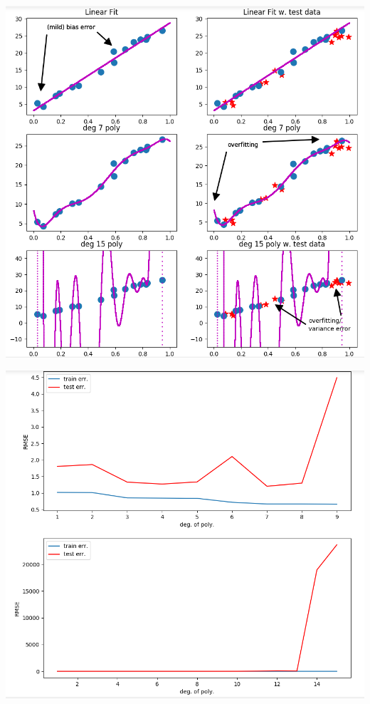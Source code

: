 \documentclass[12pt,t]{beamer}
\begin{document}
\begin{frame}

\centerline{
\includegraphics[height=1\textheight]{./images/biasvsvariance_fits.png}
} 

\end{frame}

\begin{frame}

\centerline{
\includegraphics[height=1\textheight]{./images/biasvsvariance_error.png}
} 

\end{frame}
\end{document}

